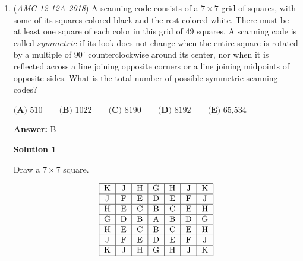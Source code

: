 \begin{enumerate}
Let $y=\log_{3x} 4 = \log_{2x} 8.$ We convert the equations with $y$ to the exponential form:
 \begin{align*} (3x)^y&=4, \\ (2x)^y&=8. \end{align*}
Cubing the first equation and squaring the second equation, we have
 \begin{align*} (3x)^{3y}&=64, \\ (2x)^{2y}&=64. \end{align*}
Applying the Transitive Property, we get 
 \begin{align*} (3x)^{3y}&=(2x)^{2y} \\ (3x)^3&=(2x)^2 \\ 27x^3&=4x^2 \\ x&=\frac{4}{27}, \end{align*}
from which the answer is $4+27=\boxed{\textbf{(D) } 31}.$



	\item (\textit{AMC 12 12A 2018}) A scanning code consists of a $7 \times 7$ grid of squares, with some of its squares colored black and the rest colored white. There must be at least one square of each color in this grid of $49$ squares. A scanning code is called $\textit{symmetric}$ if its look does not change when the entire square is rotated by a multiple of $90 ^{\circ}$ counterclockwise around its center, nor when it is reflected across a line joining opposite corners or a line joining midpoints of opposite sides. What is the total number of possible symmetric scanning codes?


 $\textbf{(A)} \text{ 510} \qquad \textbf{(B)} \text{ 1022} \qquad \textbf{(C)} \text{ 8190} \qquad \textbf{(D)} \text{ 8192} \qquad \textbf{(E)} \text{ 65,534}$

 \textbf{Answer: }B



\textbf{Solution 1}

Draw a $7 \times 7$ square.

 
 \[\begin{tabular}{|c|c|c|c|c|c|c|} \hline K & J & H & G & H & J & K \\ \hline J & F & E & D & E & F & J \\ \hline H & E & C & B & C & E & H \\ \hline G & D & B & A & B & D & G \\ \hline H & E & C & B & C & E & H \\ \hline J & F & E & D & E & F & J \\ \hline K & J & H & G & H & J & K \\ \hline \end{tabular}\]


\end{enumerate}

